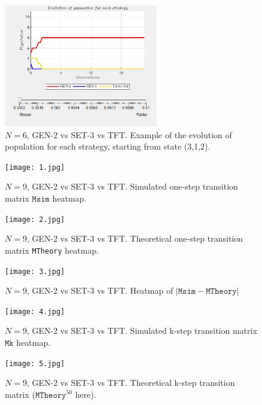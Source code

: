 \documentclass[12pt]{report}
\begin{document}
\begin{figure}[h!]
    \centering
    \includegraphics[width=0.6\textwidth]{A13-PopulationEvolution.png}
    \caption{$N=6$, GEN-2 vs SET-3 vs TFT. Example of the evolution of population for each strategy, starting from state (3,1,2).}
    \label{A13}
\end{figure}

\begin{figure}[h!]
    \centering
    \texttt{[image: 1.jpg]}
    \caption{$N=9$, GEN-2 vs SET-3 vs TFT. Simulated one-step transition matrix $\texttt{Msim}$ heatmap.}
    \label{1}
\end{figure}

\begin{figure}[h!]
    \centering
    \texttt{[image: 2.jpg]}
    \caption{$N=9$, GEN-2 vs SET-3 vs TFT. Theoretical one-step transition matrix \texttt{MTheory} heatmap.}
    \label{2}
\end{figure}

\begin{figure}[h!]
    \centering
    \texttt{[image: 3.jpg]}
    \caption{$N=9$, GEN-2 vs SET-3 vs TFT. Heatmap of $|\texttt{Msim}-\texttt{MTheory}|$}
    \label{3}
\end{figure}

\begin{figure}[h!]
    \centering
    \texttt{[image: 4.jpg]}
    \caption{$N=9$, GEN-2 vs SET-3 vs TFT. Simulated k-step transition matrix $\texttt{Mk}$ heatmap.}
    \label{4}
\end{figure}

\begin{figure}[h!]
    \centering
    \texttt{[image: 5.jpg]}
    \caption{$N=9$, GEN-2 vs SET-3 vs TFT. Theoretical k-step transition matrix ($\texttt{MTheory}^{50}$ here).}
    \label{5}
\end{figure}
\end{document}
